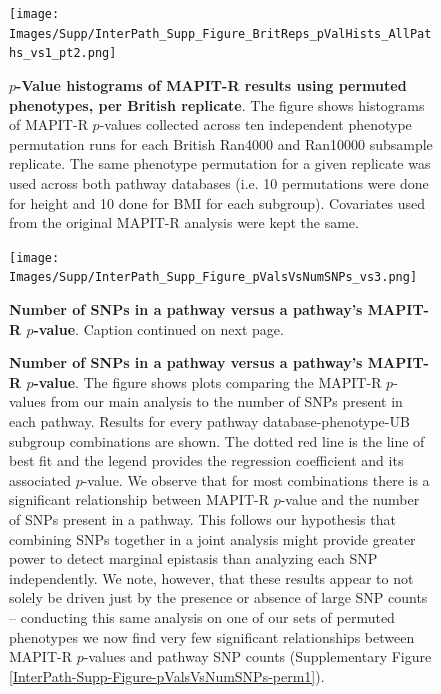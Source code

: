 \documentclass[10pt,a4paper]{article}
\begin{document}
\setlength{\footskip}{2cm}
\begin{figure}[htbp]
\centering
\vspace*{-1cm}
\texttt{[image: Images/Supp/InterPath\_Supp\_Figure\_BritReps\_pValHists\_AllPaths\_vs1\_pt2.png]}
\caption[TBD]{\textbf{$p$-Value histograms of MAPIT-R results using permuted phenotypes, per British replicate}. The figure shows histograms of MAPIT-R $p$-values collected across ten independent phenotype permutation runs for each British Ran4000 and Ran10000 subsample replicate. The same phenotype permutation for a given replicate was used across both pathway databases (i.e. 10 permutations were done for height and 10 done for BMI for each subgroup). Covariates used from the original MAPIT-R analysis were kept the same.}
\label{InterPath-Supp-Figure-BritReps-10perms-pValHists-pt2}
\end{figure}
\clearpage
\setlength{\footskip}{1cm}

\setlength{\footskip}{3cm}
\begin{figure}[htbp]
\centering
\vspace*{-2cm}
\texttt{[image: Images/Supp/InterPath\_Supp\_Figure\_pValsVsNumSNPs\_vs3.png]}
\caption[TBD]{\textbf{Number of SNPs in a pathway versus a pathway's MAPIT-R $p$-value}. Caption continued on next page.}
\label{InterPath-Supp-Figure-pValsVsNumSNPs}
\end{figure}
\clearpage
\setlength{\footskip}{1cm}

\addtocounter{figure}{-1}
\begin{figure} [t!]
  \caption{\textbf{Number of SNPs in a pathway versus a pathway's MAPIT-R $p$-value}. The figure shows plots comparing the MAPIT-R $p$-values from our main analysis to the number of SNPs present in each pathway. Results for every pathway database-phenotype-UB subgroup combinations are shown. The dotted red line is the line of best fit and the legend provides the regression coefficient and its associated $p$-value. We observe that for most combinations there is a significant relationship between MAPIT-R $p$-value and the number of SNPs present in a pathway. This follows our hypothesis that combining SNPs together in a joint analysis might provide greater power to detect marginal epistasis than analyzing each SNP independently. We note, however, that these results appear to not solely be driven just by the presence or absence of large SNP counts -- conducting this same analysis on one of our sets of permuted phenotypes we now find very few significant relationships between MAPIT-R $p$-values and pathway SNP counts (Supplementary Figure \ref{InterPath-Supp-Figure-pValsVsNumSNPs-perm1}).}
\label{InterPath-Supp-Figure-pValsVsNumSNPs-Caption}
\end{figure}
\clearpage
\end{document}

